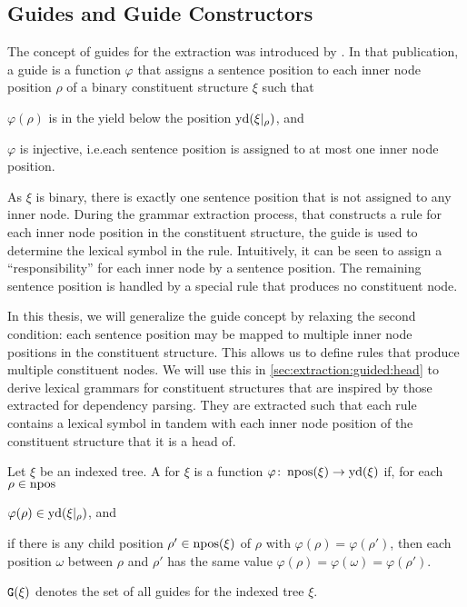\documentclass[../../document.tex]{subfiles}
\begin{document}
    \subsection{Guides and Guide Constructors}
    The concept of guides for the extraction was introduced by \citet{Rup22}.
    In that publication, a guide is a function \(\varphi\) that assigns a sentence position to each inner node position \(\rho\) of a binary constituent structure \(\xi\) such that
    \begin{inparaenum}
        \item \(\varphi(\rho)\) is in the yield below the position \(\operatorname{yd}(\xi|_\rho)\), and
        \item \(\varphi\) is injective, i.e.\@ each sentence position is assigned to at most one inner node position.
    \end{inparaenum}
    As \(\xi\) is binary, there is exactly one sentence position that is not assigned to any inner node.
    During the grammar extraction process, that constructs a rule for each inner node position in the constituent structure, the guide is used to determine the lexical symbol in the rule.
    Intuitively, it can be seen to assign a ``responsibility'' for each inner node by a sentence position.
    The remaining sentence position is handled by a special rule that produces no constituent node.

    In this thesis, we will generalize the guide concept by relaxing the second condition: each sentence position may be mapped to multiple inner node positions in the constituent structure.
    This allows us to define rules that produce multiple constituent nodes.
    We will use this in \cref{sec:extraction:guided:head} to derive lexical grammars for constituent structures that are inspired by those extracted for dependency parsing.
    They are extracted such that each rule contains a lexical symbol in tandem with each inner node position of the constituent structure that it is a head of.

    \begin{definition}[Guide]
        Let \(\xi\) be an indexed tree.
        A  for \(\xi\) is a function \(\varphi\colon \operatorname{npos}(\xi) \to \operatorname{yd}(\xi)\) if, for each \(\rho \in \operatorname{npos}\)
        \begin{inparaenum}
            \item \(\varphi(\rho) \in \operatorname{yd}(\xi|_\rho)\), and
            \item if there is any child position \(\rho' \in \operatorname{npos}(\xi)\) of \(\rho\) with \(\varphi(\rho) = \varphi(\rho')\), then each position \(\omega\) between \(\rho\) and \(\rho'\) has the same value \(\varphi(\rho) = \varphi(\omega) = \varphi(\rho')\).
        \end{inparaenum}
        \(\texttt{G}(\xi)\) denotes the set of all guides for the indexed tree \(\xi\).
    \end{definition}
\end{document}
